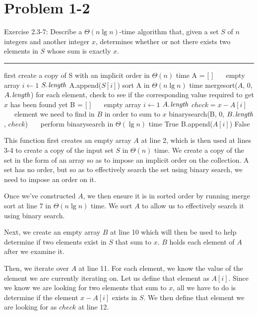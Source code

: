 \documentclass[11pt]{article}
\def\separateline{\medskip\hrule\medskip}
\begin{document}
\newpage

\section{Problem 1-2}
Exercise 2.3-7: Describe a $\Theta(n\lg{n})$-time algorithm that, given a set $S$ of $n$ integers and another integer $x$, determines whether or not there exists two elements in $S$ whose sum is exactly $x$.
\separateline
\begin{codebox}
\li \Comment first create a copy of S with an implicit order in $\Theta(n)$ time
\li A = [ ]      ~~~\Comment empty array
\li \For $i \gets 1$ \To $\attrib{S}{length}$
\li     \Do A.append($S[i]$)
\li  \End
\li \Comment sort A in $\Theta(n\lg{n})$ time
\li mergesort($A$, $0$, $\attrib{A}{length}$)
\li
\li \Comment for each element, check to see if the corresponding value required to get $x$ has been found yet
\li B = [ ]       ~~~\Comment empty array
\li \For $i \gets 1$ \To $\attrib{A}{length}$
        \Do
\li     $check = x - A[i]$  ~~~\Comment element we need to find in $B$ in order to sum to $x$
\li     \If binarysearch(B, 0, $\attrib{B}{length}$, $check$)    ~~~\Comment perform binarysearch in $\Theta(\lg{n})$ time
\li         \Then
                \Return True
        \End
\li     B.append($A[i]$)
\li \End
\li \Return False
\end{codebox}

\hspace*{6mm}

This function first creates an empty array $A$ at line 2, which is then used at lines 3-4 to create a copy of the input set $S$ in $\Theta(n)$ time. We create a copy of the set in the form of an array so as to impose an implicit order on the collection. A set has no order, but so as to effectively search the set using binary search, we need to impose an order on it.

Once we've constructed $A$, we then ensure it is in sorted order by running merge sort at line 7 in $\Theta(n\lg{n})$ time. We sort $A$ to allow us to effectively search it using binary search.

Next, we create an empty array $B$ at line 10 which will then be used to help determine if two elements exist in $S$ that sum to $x$. $B$ holds each element of $A$ after we examine it.

Then, we iterate over $A$ at line 11. For each element, we know the value of the element we are currently iterating on. Let us define that element as $A[i]$. Since we know we are looking for two elements that sum to $x$, all we have to do is determine if the element $x - A[i]$ exists in $S$. We then define that element we are looking for as $check$ at line 12.
\end{document}

